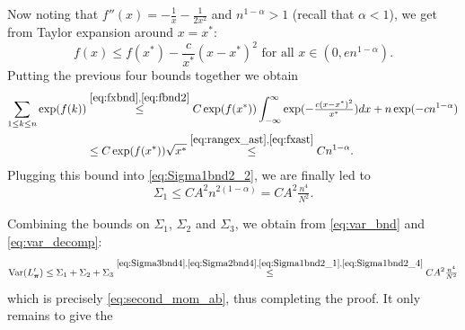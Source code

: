 \documentclass[11pt,reqno,letterpaper]{amsart}
\numberwithin{equation}{section}
\theoremstyle{plain}
\def \bpi{\boldsymbol{\pi}}
\providecommand{\var}{\operatorname{Var}}
\begin{document}
Now noting that $f''(x) = -\frac1x - \frac1{2x^2}$ and $n^{1 - \alpha} > 1$ 
(recall that $\alpha < 1$), we get from Taylor expansion around $x = x^\ast$:
\begin{equation}\label{eq:fbnd2}
f(x) \le  f(x^\ast) -\frac{c}{x^\ast}(x - x^\ast)^2 \mbox{ for all } x \in (0, en^{1 - \alpha}).
\end{equation}
Putting the previous four bounds together we obtain
\begin{equation*}%
\begin{split}
\sum_{1 \le k \le n} \exp(f(k)) &\stackrel{\eqref{eq:fxbnd}, \eqref{eq:fbnd2}}{\le} C \exp(f(x^\ast)) \int_{-\infty}^{\infty} \exp(-\tfrac{c(x - x^\ast)^2}{x^\ast}) dx  + n\exp(-c n^{1 - \alpha}) \\
&\le C \exp(f(x^\ast)) \sqrt{x^\ast} \stackrel{\eqref{eq:rangex_ast}, \eqref{eq:fxast}}{\le} C n^{1 - \alpha}.
\end{split}
\end{equation*}
Plugging this bound into \eqref{eq:Sigma1bnd2_2}, we are finally led to
\begin{equation}\label{eq:Sigma1bnd2_4}
\Sigma_1 \le CA^2 n^{2(1 - \alpha)} = CA^2 \tfrac{n^4}{N^2}.
\end{equation}

\medskip

Combining the bounds on $\Sigma_1$, $\Sigma_2$ and $\Sigma_3$, we obtain from \eqref{eq:var_bnd} and \eqref{eq:var_decomp}:
\begin{equation*}
\var(L_{\bpi}') \le  \Sigma_1 + \Sigma_2 + \Sigma_3 \stackrel{\eqref{eq:Sigma3bnd4}, \eqref{eq:Sigma2bnd4}, \eqref{eq:Sigma1bnd2_1}, \eqref{eq:Sigma1bnd2_4}}{\le} CA^2 \tfrac{n^4}{N^2}
\end{equation*}
which is precisely \eqref{eq:second_mom_ab}, thus completing the proof. It only 
remains to give the

\smallskip
\end{document}
